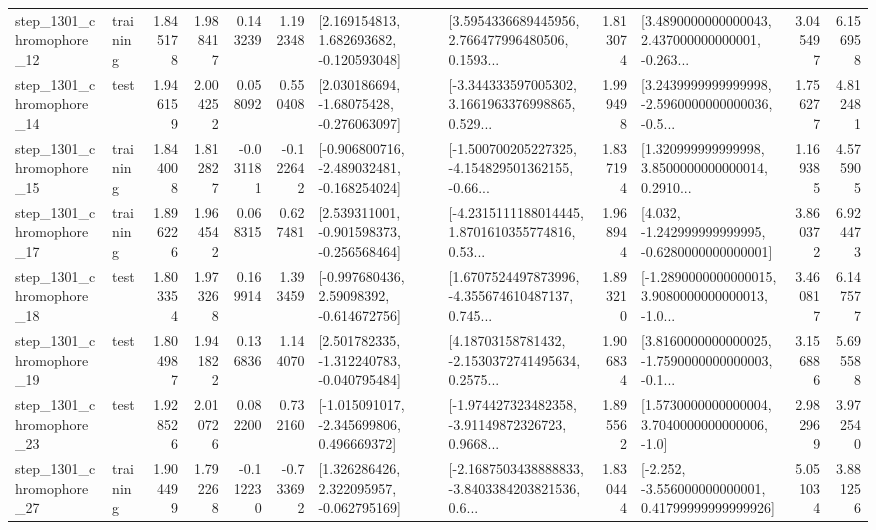 \begin{tabular}{llrrrrllrlrr}
 step\_1301\_chromophore\_12 &  training &      1.845178 &    1.988417 &      0.143239 &  1.192348 &    [2.169154813, 1.682693682, -0.120593048] &  [3.5954336689445956, 2.766477996480506, 0.1593... &       1.813074 &  [3.4890000000000043, 2.437000000000001, -0.263... &            3.045497 &          6.156958 \\
 step\_1301\_chromophore\_14 &      test &      1.946159 &    2.004252 &      0.058092 &  0.550408 &    [2.030186694, -1.68075428, -0.276063097] &  [-3.344333597005302, 3.1661963376998865, 0.529... &       1.999498 &  [3.2439999999999998, -2.5960000000000036, -0.5... &            1.756277 &          4.812481 \\
 step\_1301\_chromophore\_15 &  training &      1.844008 &    1.812827 &     -0.031181 & -0.122642 &  [-0.906800716, -2.489032481, -0.168254024] &  [-1.500700205227325, -4.154829501362155, -0.66... &       1.837194 &  [1.320999999999998, 3.8500000000000014, 0.2910... &            1.169385 &          4.575905 \\
 step\_1301\_chromophore\_17 &  training &      1.896226 &    1.964542 &      0.068315 &  0.627481 &   [2.539311001, -0.901598373, -0.256568464] &  [-4.2315111188014445, 1.8701610355774816, 0.53... &       1.968944 &   [4.032, -1.242999999999995, -0.6280000000000001] &            3.860372 &          6.924473 \\
 step\_1301\_chromophore\_18 &      test &      1.803354 &    1.973268 &      0.169914 &  1.393459 &    [-0.997680436, 2.59098392, -0.614672756] &  [1.6707524497873996, -4.355674610487137, 0.745... &       1.893210 &  [-1.2890000000000015, 3.9080000000000013, -1.0... &            3.460817 &          6.147577 \\
 step\_1301\_chromophore\_19 &      test &      1.804987 &    1.941822 &      0.136836 &  1.144070 &   [2.501782335, -1.312240783, -0.040795484] &  [4.18703158781432, -2.1530372741495634, 0.2575... &       1.906834 &  [3.8160000000000025, -1.7590000000000003, -0.1... &            3.156886 &          5.695588 \\
 step\_1301\_chromophore\_23 &      test &      1.928526 &    2.010726 &      0.082200 &  0.732160 &   [-1.015091017, -2.345699806, 0.496669372] &  [-1.974427323482358, -3.91149872326723, 0.9668... &       1.895562 &     [1.5730000000000004, 3.7040000000000006, -1.0] &            2.982969 &          3.972540 \\
 step\_1301\_chromophore\_27 &  training &      1.904499 &    1.792268 &     -0.112230 & -0.733692 &    [1.326286426, 2.322095957, -0.062795169] &  [-2.1687503438888833, -3.8403384203821536, 0.6... &       1.830444 &  [-2.252, -3.556000000000001, 0.41799999999999926] &            5.051034 &          3.881256 \\

\end{tabular}
